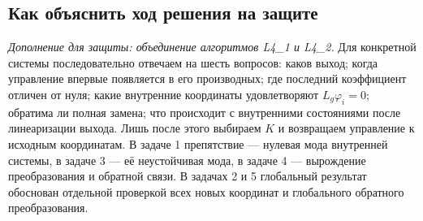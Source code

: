 \subsection{Как объяснить ход решения на защите}

\textit{Дополнение для защиты: объединение алгоритмов L4\_1 и L4\_2.}
Для конкретной системы последовательно отвечаем на шесть вопросов:
каков выход; когда управление впервые появляется в его производных;
где последний коэффициент отличен от нуля; какие внутренние
координаты удовлетворяют $L_g\varphi_i=0$; обратима ли полная замена;
что происходит с внутренними состояниями после линеаризации выхода.
Лишь после этого выбираем $K$ и возвращаем управление к исходным
координатам. В задаче 1 препятствие --- нулевая мода внутренней
системы, в задаче 3 --- её неустойчивая мода, в задаче 4 ---
вырождение преобразования и обратной связи. В задачах 2 и 5
глобальный результат обоснован отдельной проверкой всех новых
координат и глобального обратного преобразования.
